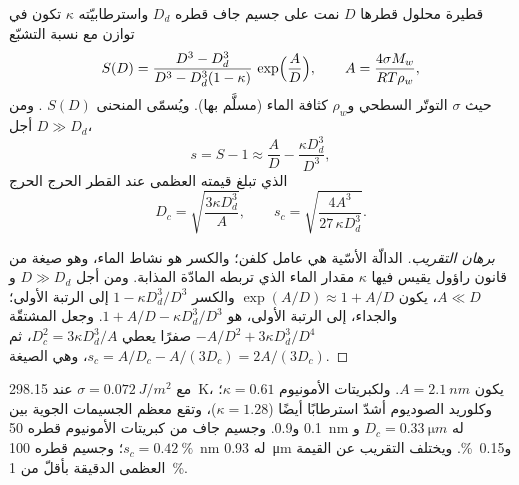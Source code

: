 \begin{proposition}\label{prop:b2:atmospheric-thermodynamics:kohler}
قطيرة محلول قطرها $D$ نمت على جسيم جاف قطره $D_d$ واسترطابيّته
$\kappa$ تكون في توازن مع نسبة التشبّع
\[
  S(D) = \frac{D^3 - D_d^3}{D^3 - D_d^3(1 - \kappa)}\,\exp\Bigl(\frac{A}{D}\Bigr), \qquad
  A = \frac{4\sigma M_w}{R T\rho_w},
\]
حيث $\sigma$ التوتّر السطحي و$\rho_w$ كثافة الماء (مسلَّم بها). ويُسمّى المنحنى $S(D)$
\emph{}. ومن أجل $D \gg D_d$،
\[
  s = S - 1 \approx \frac{A}{D} - \frac{\kappa D_d^3}{D^3},
\]
الذي تبلغ قيمته العظمى عند القطر الحرج  الحرج
\[
  D_c = \sqrt{\frac{3\kappa D_d^3}{A}}, \qquad s_c = \sqrt{\frac{4A^3}{27\,\kappa D_d^3}} .
\]
\end{proposition}

\begin{proof}[برهان التقريب]
الدالّة الأسّية هي عامل كلفن؛ والكسر هو نشاط الماء، وهو صيغة من قانون راؤول
يقيس فيها $\kappa$ مقدار الماء الذي تربطه المادّة المذابة. ومن أجل $D \gg D_d$
و$A \ll D$، يكون $\exp(A/D) \approx 1 + A/D$ والكسر $1 - \kappa D_d^3/D^3$ إلى الرتبة
الأولى؛ والجداء، إلى الرتبة الأولى، هو $1 + A/D - \kappa D_d^3/D^3$. وجعل المشتقّة
$-A/D^2 + 3\kappa D_d^3/D^4$ صفرًا يعطي $D_c^2 = 3\kappa D_d^3/A$، ثم $s_c = A/D_c -
A/(3D_c) = 2A/(3D_c)$، وهي الصيغة.
\end{proof}

مع $\sigma = \qty{0.072}{J/m^2}$ عند \qty{298.15}{K}، يكون $A = \qty{2.1}{nm}$. ولكبريتات الأمونيوم
$\kappa = 0.61$؛ وكلوريد الصوديوم أشدّ استرطابًا أيضًا ($\kappa = 1.28$)، وتقع معظم الجسيمات الجوية بين 0.1 و0.9.
وجسيم جاف من كبريتات الأمونيوم قطره \qty{50}{nm} له $D_c = \qty{0.33}{\micro m}$ و$s_c =
\qty{0.42}{\percent}$؛ وجسيم قطره \qty{100}{nm} له \qty{0.93}{\micro m} و\qty{0.15}{\percent}.
ويختلف التقريب عن القيمة العظمى الدقيقة بأقلّ من \qty{1}{\percent}.

